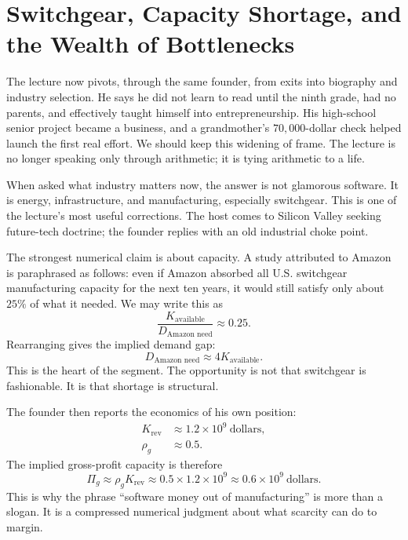 \section{Switchgear, Capacity Shortage, and the Wealth of Bottlenecks}

The lecture now pivots, through the same founder, from exits into biography and industry selection. He says he did not learn to read until the ninth grade, had no parents, and effectively taught himself into entrepreneurship. His high-school senior project became a business, and a grandmother's \(70{,}000\)-dollar check helped launch the first real effort. We should keep this widening of frame. The lecture is no longer speaking only through arithmetic; it is tying arithmetic to a life.

When asked what industry matters now, the answer is not glamorous software. It is energy, infrastructure, and manufacturing, especially switchgear. This is one of the lecture's most useful corrections. The host comes to Silicon Valley seeking future-tech doctrine; the founder replies with an old industrial choke point.

The strongest numerical claim is about capacity. A study attributed to Amazon is paraphrased as follows: even if Amazon absorbed all U.S. switchgear manufacturing capacity for the next ten years, it would still satisfy only about \(25\%\) of what it needed. We may write this as
\begin{equation}
\frac{K_{\text{available}}}{D_{\text{Amazon need}}} \approx 0.25.
\end{equation}
Rearranging gives the implied demand gap:
\begin{equation}
D_{\text{Amazon need}} \approx 4 K_{\text{available}}.
\end{equation}
This is the heart of the segment. The opportunity is not that switchgear is fashionable. It is that shortage is structural.

The founder then reports the economics of his own position:
\begin{align}
K_{\text{rev}} &\approx 1.2 \times 10^9 \ \text{dollars},\\
\rho_g &\approx 0.5.
\end{align}
The implied gross-profit capacity is therefore
\begin{equation}
\Pi_g \approx \rho_g K_{\text{rev}}
\approx 0.5 \times 1.2 \times 10^9
\approx 0.6 \times 10^9 \ \text{dollars}.
\end{equation}
This is why the phrase ``software money out of manufacturing'' is more than a slogan. It is a compressed numerical judgment about what scarcity can do to margin.

